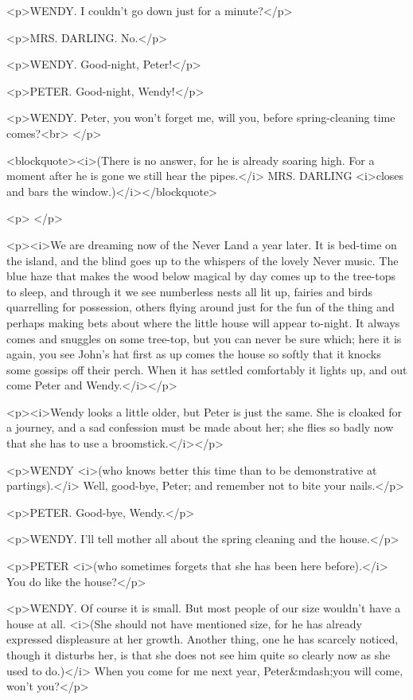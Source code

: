 <p>WENDY. I couldn't go down just for a minute?</p>

<p>MRS. DARLING. No.</p>

<p>WENDY. Good-night, Peter!</p>

<p>PETER. Good-night, Wendy!</p>

<p>WENDY. Peter, you won't forget me, will you, before
spring-cleaning time comes?<br>
</p>

<blockquote><i>(There is no answer, for he is already soaring high.
For a moment after he is gone we still hear the pipes.</i> MRS.
DARLING <i>closes and bars the window.)</i></blockquote>

<p> </p>

<p><i>We are dreaming now of the Never Land a year later. It is
bed-time on the island, and the blind goes up to the whispers of the
lovely Never music. The blue haze that makes the wood below magical
by day comes up to the tree-tops to sleep, and through it we see
numberless nests all lit up, fairies and birds quarrelling for
possession, others flying around just for the fun of the thing and
perhaps making bets about where the little house will appear
to-night. It always comes and snuggles on some tree-top, but you can
never be sure which; here it is again, you see John's hat first as up
comes the house so softly that it knocks some gossips off their
perch. When it has settled comfortably it lights up, and out come
Peter and Wendy.</i></p>

<p><i>Wendy looks a little older, but Peter is just the same. She is
cloaked for a journey, and a sad confession must be made about her;
she flies so badly now that she has to use a broomstick.</i></p>

<p>WENDY <i>(who knows better this time than to be demonstrative at
partings).</i> Well, good-bye, Peter; and remember not to bite your
nails.</p>

<p>PETER. Good-bye, Wendy.</p>

<p>WENDY. I'll tell mother all about the spring cleaning and the
house.</p>

<p>PETER <i>(who sometimes forgets that she has been here
before).</i> You do like the house?</p>

<p>WENDY. Of course it is small. But most people of our size wouldn't
have a house at all. <i>(She should not have mentioned size, for he
has already expressed displeasure at her growth. Another thing, one
he has scarcely noticed, though it disturbs her, is that she does not
see him quite so clearly now as she used to do.)</i> When you come
for me next year, Peter&mdash;you will come, won't you?</p>

